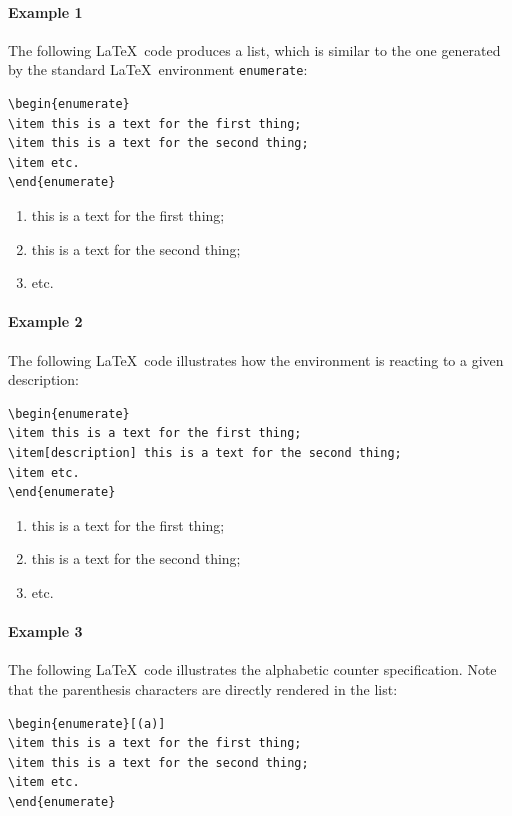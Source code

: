 \documentclass[book,taskpackage,specpackage,codepackage]{upmethodology-document}
\begin{document}
\paragraph{Example 1} The following \LaTeX~code produces a list, which is similar to the one generated by the standard \LaTeX\ environment \texttt{enumerate}:
\begin{verbatim}
\begin{enumerate}
\item this is a text for the first thing;
\item this is a text for the second thing;
\item etc.
\end{enumerate}
\end{verbatim}

\begin{enumerate}
\item this is a text for the first thing;
\item this is a text for the second thing;
\item etc.
\end{enumerate}

\paragraph{Example 2} The following \LaTeX~code illustrates how the environment is reacting to a given description:
\begin{verbatim}
\begin{enumerate}
\item this is a text for the first thing;
\item[description] this is a text for the second thing;
\item etc.
\end{enumerate}
\end{verbatim}

\begin{enumerate}
\item this is a text for the first thing;
\item[description] this is a text for the second thing;
\item etc.
\end{enumerate}

\paragraph{Example 3} The following \LaTeX~code illustrates the alphabetic counter specification. Note that the parenthesis characters are directly rendered in the list:
\begin{verbatim}
\begin{enumerate}[(a)]
\item this is a text for the first thing;
\item this is a text for the second thing;
\item etc.
\end{enumerate}
\end{verbatim}
\end{document}
